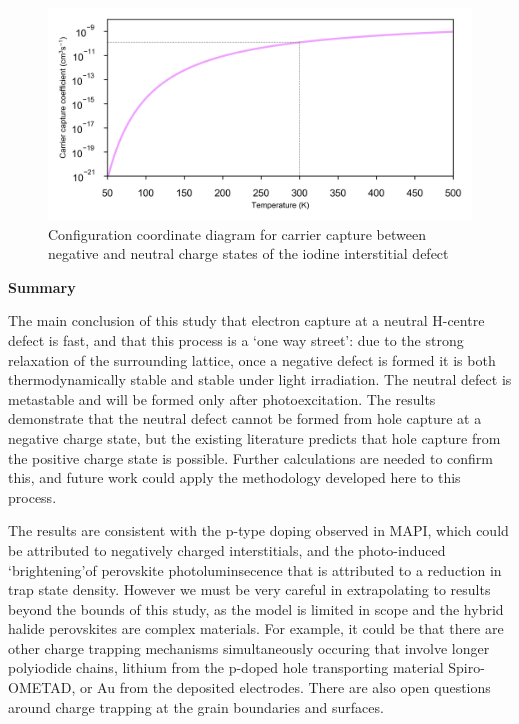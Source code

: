 \begin{figure}[h!]   
\centering
  \includegraphics[width=1.0\columnwidth]{figures/ch6/carrier_capture_rate.png}
  \caption[Rate of electron capture at the ]{Configuration coordinate diagram for carrier capture between negative and neutral charge states of the iodine interstitial defect}
\label{carrier_capture_rate}
\end{figure}




\textbf{Summary}

The main conclusion of this study that electron capture at a neutral H-centre defect is fast, and that this process is a `one way street': due to the strong relaxation of the surrounding lattice, once a negative defect is formed it is both thermodynamically stable and stable under light irradiation.
The neutral defect is metastable and will be formed only after photoexcitation. The results demonstrate that the neutral defect cannot be formed from hole capture at a negative charge state, but the existing literature predicts that hole capture from the positive charge state is possible. Further calculations are needed to confirm this, and future work could apply the methodology developed here to this process. 

The results are consistent with the p-type doping observed in MAPI, which could be attributed to negatively charged interstitials, and the photo-induced `brightening'of perovskite photoluminsecence that is attributed to a reduction in trap state density.
However we must be very careful in extrapolating to results beyond the bounds of this study,
as the model is limited in scope and the hybrid halide perovskites are complex materials. 
For example, it could be that there are other charge trapping mechanisms simultaneously occuring that involve longer polyiodide chains, lithium from the p-doped hole transporting material Spiro-OMETAD, or Au from the deposited electrodes. There are also open questions around charge trapping at the grain boundaries and surfaces.

